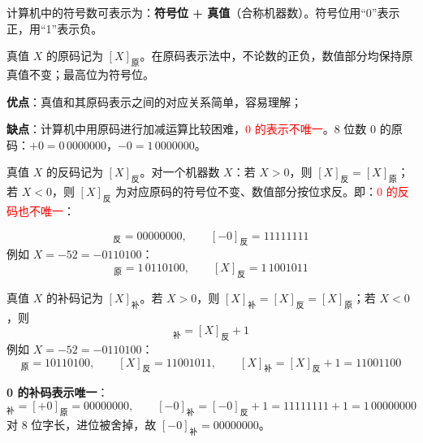 计算机中的符号数可表示为：\textbf{符号位 + 真值}（合称机器数）。符号位用“0”表示正，用“1”表示负。

\begin{definition}[原码]
\label{def:原码}
真值 $X$ 的原码记为 $[X]_{\text{原}}$。在原码表示法中，不论数的正负，数值部分均保持原真值不变；最高位为符号位。

\textbf{优点}：真值和其原码表示之间的对应关系简单，容易理解；

\textbf{缺点}：计算机中用原码进行加减运算比较困难，\textcolor{red}{0 的表示不唯一}。8 位数 0 的原码：$+0=0\,0000000$，$-0=1\,0000000$。
\end{definition}

\begin{definition}[反码]
\label{def:反码}
真值 $X$ 的反码记为 $[X]_{\text{反}}$。对一个机器数 $X$：若 $X>0$，则 $[X]_{\text{反}}=[X]_{\text{原}}$；若 $X<0$，则 $[X]_{\text{反}}$ 为对应原码的符号位不变、数值部分按位求反。即：\textcolor{red}{0 的反码也不唯一}：

\begin{equation}
	[+0]_{\text{反}}=00000000,\qquad [-0]_{\text{反}}=11111111
	\label{eq:补码:反码0}
\end{equation}
例如 $X=-52=-0110100$：
\begin{equation}
	[X]_{\text{原}}=1\,0110100,\qquad [X]_{\text{反}}=1\,1001011
	\label{eq:补码:反码例}
\end{equation}
\end{definition}

\begin{definition}[补码]
\label{def:补码}
真值 $X$ 的补码记为 $[X]_{\text{补}}$。若 $X>0$，则 $[X]_{\text{补}}=[X]_{\text{反}}=[X]_{\text{原}}$；若 $X<0$，则
\begin{equation}
	[X]_{\text{补}}=[X]_{\text{反}}+1
	\label{eq:补码:定义}
\end{equation}
例如 $X=-52=-0110100$：
\begin{equation}
	[X]_{\text{原}}=10110100,\qquad [X]_{\text{反}}=11001011,\qquad
	[X]_{\text{补}}=[X]_{\text{反}}+1=11001100
	\label{eq:补码:补码例}
\end{equation}
\end{definition}

\textbf{0 的补码表示唯一}：
\begin{equation}
	[+0]_{\text{补}}=[+0]_{\text{原}}=00000000,\qquad
	[-0]_{\text{补}}=[-0]_{\text{反}}+1=11111111+1=1\,00000000
	\label{eq:补码:0的补码}
\end{equation}
对 8 位字长，进位被舍掉，故 $[-0]_{\text{补}}=00000000$。

